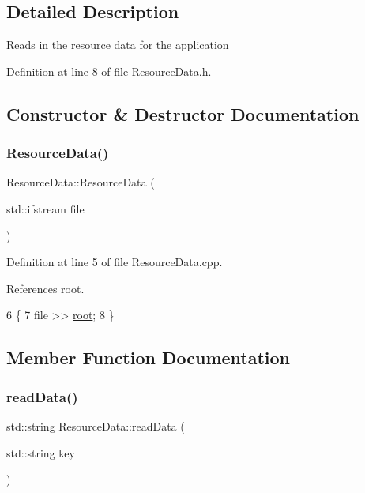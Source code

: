 \subsection{Detailed Description}
Reads in the resource data for the application 

Definition at line 8 of file Resource\+Data.\+h.



\subsection{Constructor \& Destructor Documentation}
\mbox{\label{class_resource_data_afa0fffd6caad715b697c1b3a388c975d}} 
\subsubsection{\texorpdfstring{Resource\+Data()}{ResourceData()}}
{\footnotesize\ttfamily Resource\+Data\+::\+Resource\+Data (\begin{DoxyParamCaption}\item[{std\+::ifstream}]{file }\end{DoxyParamCaption})}



Definition at line 5 of file Resource\+Data.\+cpp.



References root.


\begin{DoxyCode}
6 \{
7     file >> \hyperlink{class_resource_data_a0e9ea464b4a3fae26f68d01e344008fb}{root};
8 \}
\end{DoxyCode}


\subsection{Member Function Documentation}
\mbox{\label{class_resource_data_a2e18ba115b2598590c15a16240542948}} 
\subsubsection{\texorpdfstring{read\+Data()}{readData()}}
{\footnotesize\ttfamily std\+::string Resource\+Data\+::read\+Data (\begin{DoxyParamCaption}\item[{std\+::string}]{key }\end{DoxyParamCaption})}



